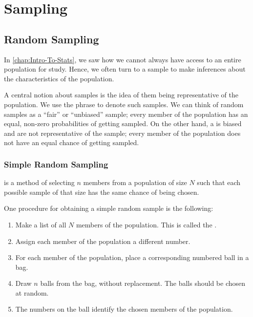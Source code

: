 \chapter{Sampling}

\section{Random Sampling}

In \SS\ref{chap:Intro-To-Stats}, we saw how we cannot always have access to an entire population for study. Hence, we often turn to a sample to make inferences about the characteristics of the population.

A central notion about samples is the idea of them being representative of the population. We use the phrase  to denote such samples. We can think of random samples as a ``fair'' or ``unbiased'' sample; every member of the population has an equal, non-zero probabilities of getting sampled. On the other hand, a  is biased and are not representative of the sample; every member of the population does not have an equal chance of getting sampled.

\subsection{Simple Random Sampling}

 is a method of selecting $n$ members from a population of size $N$ such that each possible sample of that size has the same chance of being chosen.

One procedure for obtaining a simple random sample is the following:

\begin{recipe}
    \phantom{.}
    \renewcommand{\theenumi}{\arabic{enumi}.}%
    \begin{enumerate}
        \item Make a list of all $N$ members of the population. This is called the .
        \item Assign each member of the population a different number.
        \item For each member of the population, place a corresponding numbered ball in a bag.
        \item Draw $n$ balls from the bag, without replacement. The balls should be chosen at random.
        \item The numbers on the ball identify the chosen members of the population.
    \end{enumerate}
    \renewcommand{\theenumi}{(\alph{enumi})}
\end{recipe}

